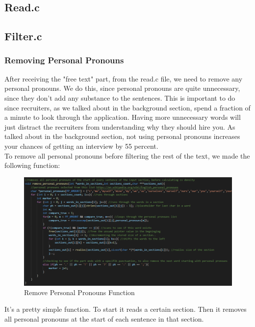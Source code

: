 \subsection{Read.c}
\subsection{Filter.c}


\subsubsection{Removing Personal Pronouns}
After receiving the "free text" part, from the read.c file, we need to remove any personal pronouns.
We do this, since personal pronouns are quite unnecessary, since they don't add any substance to the sentences.
This is important to do since recruiters, as we talked about in the background section, spend a fraction of a minute
to look through the application. 
Having more unnecessary words will just distract the recruiters from understanding why they should hire you.
As talked about in the background section, not using personal pronouns increases your
chances of getting an interview by 55 percent.
\\
To remove all personal pronouns before filtering the rest of the text, we made the following function:
\begin{figure}[H]
  \centering
  \includegraphics[scale = 0.6]{figures/personal_pronoun.png}
  \caption{Remove Personal Pronouns Function}
\end{figure}
It's a pretty simple function. To start it reads a certain section. Then it removes all personal pronouns at the start of each sentence in that section.
